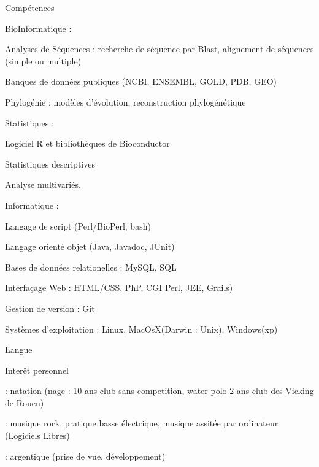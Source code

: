 \documentclass[a4paper, 11pt]{article}
\begin{document}
\begin{Section}{Compétences}
 
\SubPoint BioInformatique :
\begin{List}
\item Analyses de Séquences : recherche de séquence par Blast, alignement de séquences (simple ou multiple)
\item Banques de données publiques (NCBI, ENSEMBL, GOLD, PDB, GEO) 	
\item Phylogénie : modèles d'évolution, reconstruction phylogénétique 
\end{List}

\SubPoint Statistiques :
\begin{List}
\item Logiciel R et bibliothèques de Bioconductor
\item Statistiques descriptives
\item Analyse multivariés.
\end{List}	
\newpage

\SubPoint Informatique :  
\begin{List}
\item Langage de script (Perl/BioPerl, bash)
\item Langage orienté objet (Java, Javadoc, JUnit) 
\item Bases de données relationelles : MySQL, SQL  
\item Interfaçage Web : HTML/CSS, PhP, CGI Perl, JEE, Grails)
\item Gestion de version : Git
\item Systèmes d'exploitation : Linux, MacOsX(Darwin : Unix), Windows(xp)	
\end{List}



\end{Section}
\begin{Section}{Langue}
 
\end{Section} 
%
%
%
%
%
%
\begin{Section}{Interêt personnel}

 : natation (nage : 10 ans club sans competition, water-polo 2 ans club des Vicking de Rouen)

 : musique rock, pratique basse électrique, musique assitée par ordinateur (Logiciels Libres)

 : argentique (prise de vue, développement)
\end{Section}
\end{document}
